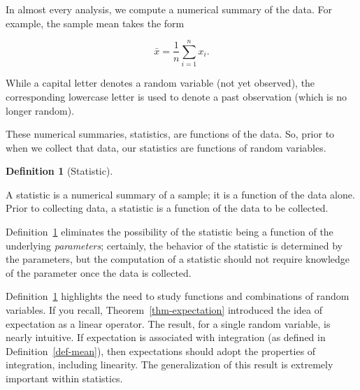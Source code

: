 \documentclass[
  letterpaper,
  DIV=11,
  numbers=noendperiod]{scrreprt}
\theoremstyle{definition}
\newtheorem{definition}{Definition}[chapter]
\theoremstyle{plain}
\theoremstyle{definition}
\theoremstyle{remark}
\begin{document}
In almost every analysis, we compute a numerical summary of the data.
For example, the sample mean takes the form

\[\bar{x} = \frac{1}{n} \sum_{i=1}^{n} x_i.\]

\begin{tcolorbox}[enhanced jigsaw, rightrule=.15mm, leftrule=.75mm, opacityback=0, coltitle=black, bottomrule=.15mm, opacitybacktitle=0.6, left=2mm, colframe=quarto-callout-note-color-frame, breakable, colback=white, arc=.35mm, toprule=.15mm, toptitle=1mm, bottomtitle=1mm, title=\textcolor{quarto-callout-note-color}{\faInfo}\hspace{0.5em}{Note}, titlerule=0mm, colbacktitle=quarto-callout-note-color!10!white]

While a capital letter denotes a random variable (not yet observed), the
corresponding lowercase letter is used to denote a past observation
(which is no longer random).

\end{tcolorbox}

These numerical summaries, statistics, are functions of the data. So,
prior to when we collect that data, our statistics are functions of
random variables.

\begin{definition}[Statistic]\protect\hypertarget{def-statistic}{}\label{def-statistic}

A statistic is a numerical summary of a sample; it is a function of the
data alone. Prior to collecting data, a statistic is a function of the
data to be collected.

\end{definition}

Definition~\ref{def-statistic} eliminates the possibility of the
statistic being a function of the underlying \emph{parameters};
certainly, the behavior of the statistic is determined by the
parameters, but the computation of a statistic should not require
knowledge of the parameter once the data is collected.

Definition~\ref{def-statistic} highlights the need to study functions
and combinations of random variables. If you recall,
Theorem~\ref{thm-expectation} introduced the idea of expectation as a
linear operator. The result, for a single random variable, is nearly
intuitive. If expectation is associated with integration (as defined in
Definition~\ref{def-mean}), then expectations should adopt the
properties of integration, including linearity. The generalization of
this result is extremely important within statistics.
\end{document}
